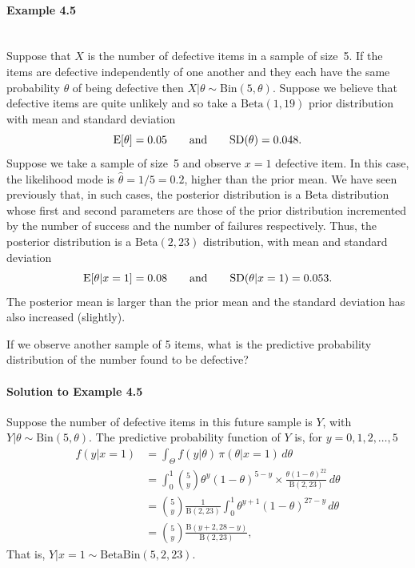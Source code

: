 \paragraph{Example 4.5}{~\\
Suppose that $X$ is the number of defective items in a sample of
size~5. If the items are defective independently of one another and
they each have the same probability $\theta$ of being defective then
$X|\theta\sim \text{Bin}(5,\theta)$. Suppose we believe that defective items
are quite unlikely and so take a $\text{Beta}(1,19)$ prior distribution with
mean and standard deviation
\begin{equation*}
\text{E}[\theta]=0.05\quad\quad\text{and}\quad\quad \textnormal{SD}(\theta)=0.048.
\end{equation*}
Suppose we take a sample of size~5 and observe $x=1$ defective item.
In this case, the likelihood mode is $\hat{\theta}=1/5=0.2$, higher than
the prior mean. We have seen previously that, in such cases, the
posterior distribution is a $\text{Beta}$ distribution whose first and second
parameters are those of the prior distribution incremented by the
number of success and the number of failures respectively. Thus, the
posterior distribution is a $\text{Beta}(2,23)$ distribution, with mean and
standard deviation
$$
\text{E}[\theta|x=1]=0.08\quad\quad\text{and}\quad\quad \textnormal{SD}(\theta|x=1)=0.053.
$$
The posterior mean is larger than the prior mean and the standard
deviation has also increased (slightly).

If we observe another sample of 5 items, what is the predictive
probability distribution of the number found to be defective?

\clearpage

\paragraph{Solution to Example 4.5}{
    
    Suppose the number of defective items in this future sample is $Y$, with $Y|\theta\sim \text{Bin}(5,\theta)$. The predictive probability function of $Y$ is, for $y=0,1,2,\ldots,5$
    \begin{align*}
    f(y|x=1)
    &=\int_\Theta f(y|\theta)\,\pi(\theta|x=1)\,d\theta \\
    &=\int_0^1 \binom{5}{y}\theta^y(1-\theta)^{5-y}
    \times \frac{\theta(1-\theta)^{22}}{\mathrm{B}(2,23)}\,d\theta \\
    &=\binom{5}{y}\frac{1}{\mathrm{B}(2,23)}
    \int_0^1 \theta^{y+1}(1-\theta)^{27-y}\,d\theta \\
    &=\binom{5}{y}\frac{\mathrm{B}(y+2,28-y)}{\mathrm{B}(2,23)},
    \end{align*}
    That is, $Y|x=1\sim \text{BetaBin}(5,2,23)$.
    
}}

